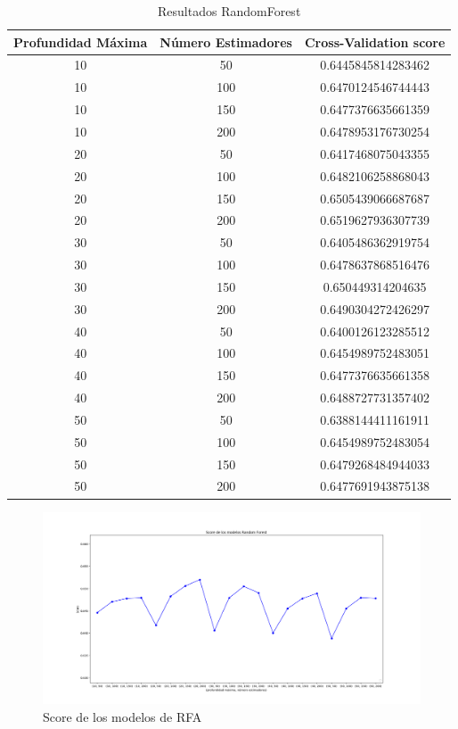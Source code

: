 \documentclass[size=a4, parskip=half, titlepage=false, toc=flat, toc=bib, 12pt]{scrartcl}
\begin{document}
\begin{table}[ht]
    \centering
    \caption{Resultados RandomForest}
    \label{tab:results-plapocket}
    \begin{tabular}{c | c | c  }
  Profundidad Máxima & Número Estimadores & Cross-Validation score \\
 \hline

10 & 50  & 0.6445845814283462 \\
10 & 100&  0.6470124546744443 \\
10 & 150&  0.6477376635661359 \\
10 & 200&  0.6478953176730254 \\
20 & 50&   0.6417468075043355 \\
20 & 100&  0.6482106258868043 \\
20 & 150&  0.6505439066687687 \\
20 & 200&  0.6519627936307739 \\
30 & 50&   0.6405486362919754 \\
30 & 100&  0.6478637868516476 \\
30 & 150&  0.650449314204635 \\
30 & 200&  0.6490304272426297 \\
40 & 50&   0.6400126123285512 \\
40 & 100&  0.6454989752483051 \\
40 & 150&  0.6477376635661358 \\
40 & 200&  0.6488727731357402 \\
50 & 50&   0.6388144411161911 \\
50 & 100&  0.6454989752483054 \\
50 & 150&  0.6479268484944033 \\
50 & 200&  0.6477691943875138
    \end{tabular}
\end{table}

\begin{figure}[H]
\centering
\includegraphics[width=1\textwidth]{./img/Figure_3}
\caption{Score de los modelos de RFA}
\end{figure}
\end{document}

